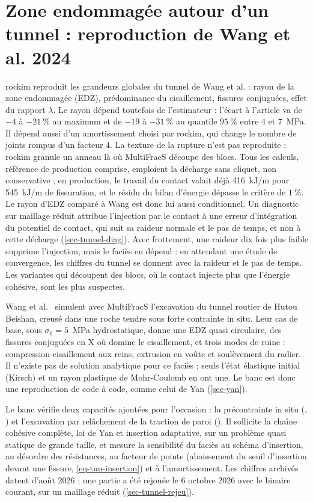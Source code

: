 \section{Zone endommagée autour d'un tunnel : reproduction de Wang et al. 2024}
\label{sec-tunnel}

rockim reproduit les grandeurs globales du tunnel de Wang et al. : rayon de la zone endommagée (EDZ), prédominance du cisaillement, fissures conjuguées, effet du rapport $\lambda$. Le rayon dépend toutefois de l'estimateur : l'écart à l'article va de $-4$ à $-21~\%$ au maximum et de $-19$ à $-31~\%$ au quantile $95~\%$ entre 4 et 7~MPa. Il dépend aussi d'un amortissement choisi par rockim, qui change le nombre de joints rompus d'un facteur 4. La texture de la rupture n'est pas reproduite : rockim granule un anneau là où MultiFracS découpe des blocs. Tous les calculs, référence de production comprise, emploient la décharge  sans cliquet, non conservative ; en production, le travail du contact valait déjà 416~kJ/m pour 545~kJ/m de fissuration, et le résidu du bilan d'énergie dépasse le critère de $1~\%$. Le rayon d'EDZ comparé à Wang est donc lui aussi conditionnel. Un diagnostic sur maillage réduit attribue l'injection par le contact à une erreur d'intégration du potentiel de contact, qui suit sa raideur normale et le pas de temps, et non à cette décharge (\cref{sec-tunnel-diag}). Avec frottement, une raideur dix fois plus faible supprime l'injection, mais le faciès en dépend : en attendant une étude de convergence, les chiffres du tunnel se donnent avec la raideur et le pas de temps. Les variantes qui découpent des blocs, où le contact injecte plus que l'énergie cohésive, sont les plus suspectes.

Wang et al.~\cite{wang2024tunnel} simulent avec MultiFracS l'excavation du tunnel routier de Hutou Beishan, creusé dans une roche tendre sous forte contrainte in situ. Leur cas de base, sous $\sigma_0 = 5$~MPa hydrostatique, donne une EDZ quasi circulaire, des fissures conjuguées en X où domine le cisaillement, et trois modes de ruine : compression-cisaillement aux reins, extrusion en voûte et soulèvement du radier. Il n'existe pas de solution analytique pour ce faciès ; seuls l'état élastique initial (Kirsch) et un rayon plastique de Mohr-Coulomb en ont une. Le banc est donc une reproduction de code à code, comme celui de Yan (\cref{sec-yan}).

Le banc vérifie deux capacités ajoutées pour l'occasion : la précontrainte in situ (, ) et l'excavation par relâchement de la traction de paroi (). Il sollicite la chaîne cohésive complète, loi de Yan et insertion adaptative, sur un problème quasi statique de grande taille, et mesure la sensibilité du faciès au schéma d'insertion, au désordre des résistances, au facteur de pointe (abaissement du seuil d'insertion devant une fissure, \cref{eq-tun-insertion}) et à l'amortissement. Les chiffres archivés datent d'août 2026 ; une partie a été rejouée le 6 octobre 2026 avec le binaire courant, sur un maillage réduit (\cref{sec-tunnel-rejeu}).

